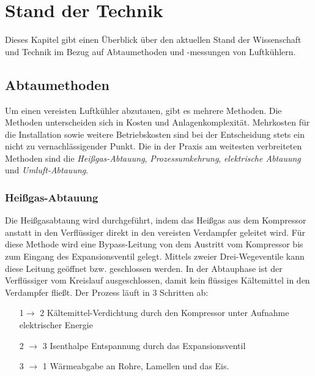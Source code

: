 \chapter{Stand der Technik}
\label{cha:Stand der Technik}



Dieses Kapitel gibt einen Überblick über den aktuellen Stand der Wissenschaft und Technik im Bezug auf Abtaumethoden und -messungen von Luftkühlern.



\section{Abtaumethoden}
\label{sec: Abtaumethoden}

Um einen vereisten Luftkühler abzutauen, gibt es mehrere Methoden. Die Methoden unterscheiden sich in Kosten und Anlagenkomplexität. Mehrkosten für die Installation sowie weitere Betriebskosten sind bei der Entscheidung stets ein nicht zu vernachlässigender Punkt.
Die in der Praxis am weitesten verbreiteten Methoden sind die \textit{Heißgas-Abtauung}, \textit{Prozessumkehrung}, \textit{elektrische Abtauung} und \textit{Umluft-Abtauung}.


\subsection*{Heißgas-Abtauung}

Die Heißgasabtaung wird durchgeführt, indem das Heißgas aus dem Kompressor anstatt in den Verflüssiger direkt in den vereisten Verdampfer geleitet wird. Für diese Methode wird eine Bypass-Leitung von dem Austritt vom Kompressor bis zum Eingang des Expansionsventil gelegt. Mittels zweier Drei-Wegeventile kann diese Leitung geöffnet bzw. geschlossen werden. In der Abtauphase ist der Verflüssiger vom Kreislauf ausgeschlossen, damit kein flüssiges Kältemittel in den Verdampfer fließt. \citep{Baehr2013}
Der Prozess läuft in 3 Schritten ab:

\begin{itemize}
\addtolength{\itemindent}{0.4cm}
\item[1$\longrightarrow$ 2] Kältemittel-Verdichtung durch den Kompressor unter Aufnahme elektrischer Energie

\item[2 $\longrightarrow$ 3] Isenthalpe Entspannung durch das Expansionsventil

\item[3 $\longrightarrow$ 1] Wärmeabgabe an Rohre, Lamellen und das Eis. 
\end{itemize}


